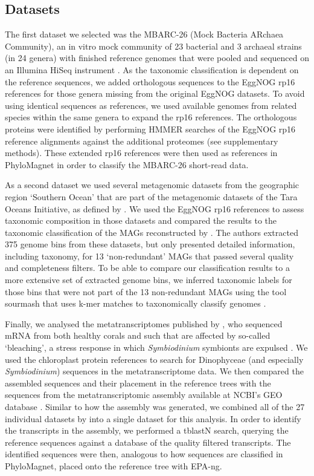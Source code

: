 \documentclass[a4paper]{article}
\begin{document}
\subsection{Datasets}
The first dataset we selected was the MBARC-26 (Mock Bacteria ARchaea Community), an in vitro mock community of 23 bacterial and 3 archaeal strains (in 24 genera) with finished reference genomes that were pooled and sequenced on an Illumina HiSeq instrument \citep{Singer2016}. As the taxonomic classification is dependent on the reference sequences, we added orthologous sequences to the EggNOG rp16 references for those genera missing from the original EggNOG datasets. To avoid using identical sequences as references, we used available genomes from related species within the same genera to expand the rp16 references. The orthologous proteins were identified by performing HMMER \citep[v3.1b2;][]{Eddy2011} searches of the EggNOG rp16 reference alignments against the additional proteomes (see supplementary methods). These extended rp16 references were then used as references in PhyloMagnet in order to classify the MBARC-26 short-read data. 

As a second dataset we used several metagenomic datasets from the geographic region ‘Southern Ocean’ that are part of the metagenomic datasets of the Tara Oceans Initiative, as defined by \cite{Delmont2018}. We used the EggNOG rp16 references to assess taxonomic composition in those datasets and compared the results to the taxonomic classification of the MAGs reconstructed by \cite{Delmont2018}. The authors extracted 375 genome bins from these datasets, but only presented detailed information, including taxonomy, for 13 ‘non-redundant’ MAGs that passed several quality and completeness filters. To be able to compare our classification results to a more extensive set of extracted genome bins, we inferred taxonomic labels for those bins that were not part of the 13 non-redundant MAGs using the tool sourmash that uses k-mer matches to taxonomically classify genomes \citep{TitusBrown2016}.

Finally, we analysed the metatranscriptomes published by \citet{Frazier2017}, who sequenced mRNA from both healthy corals and such that are affected by so-called ‘bleaching’, a stress response in which \textit{Symbiodinium} symbionts are expulsed \citep{Howe2008}. We used the chloroplast protein references to search for Dinophyceae (and especially \textit{Symbiodinium}) sequences in the metatranscriptome data. We then compared the assembled sequences and their placement in the reference trees with the sequences from the metatranscriptomic assembly available at NCBI’s GEO database \citep{Barrett2012}. Similar to how the assembly was generated, we combined all of the 27 individual datasets by \citet{Frazier2017} into a single dataset for this analysis. In order to identify the transcripts in the assembly, we performed a tblastN search, querying the reference sequences against a database of the quality filtered transcripts. The identified sequences were then, analogous to how sequences are classified in PhyloMagnet, placed onto the reference tree with EPA-ng. 
\end{document}
